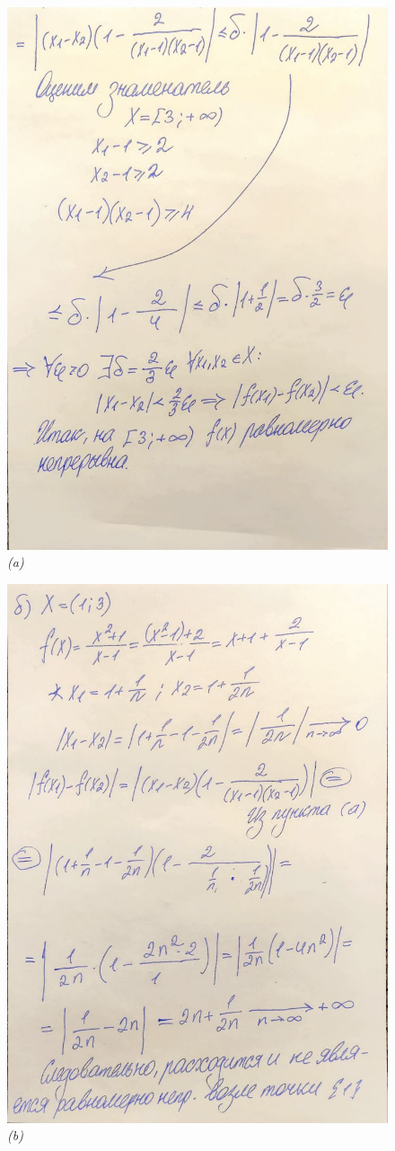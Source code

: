 \documentclass[a4paper,12pt]{article}
\begin{document}
\begin{figure}[H]
    \centering
    \includegraphics[width=0.8\linewidth]{img/1_2.jpg}
    \caption{\emph{(a)}}
    \label{fig:part2}
\end{figure}

\begin{figure}[H]
    \centering
    \includegraphics[width=0.8\linewidth]{img/1_3.jpg}
    \caption{\emph{(b)}}
    \label{fig:part3}
\end{figure}
\end{document}
